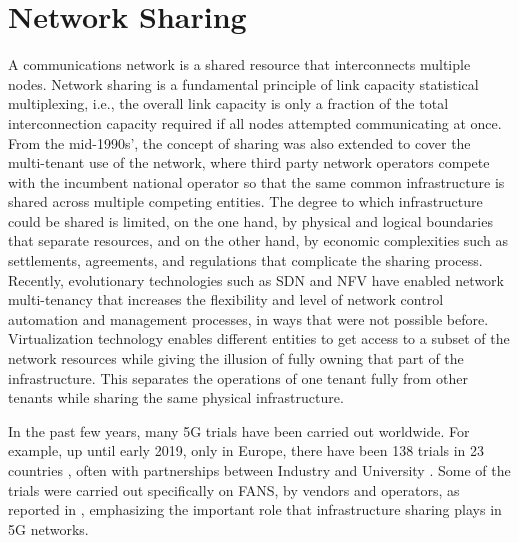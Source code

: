 \section{Network Sharing}
\label{Back:Sec:sharing}

A communications network is a shared resource that interconnects multiple nodes. Network sharing is a fundamental principle of link capacity statistical multiplexing, i.e., the overall link capacity is only a fraction of the total interconnection capacity required if all nodes attempted communicating at once.
From the mid-1990s', the concept of sharing was also extended to cover the multi-tenant use of the network, where third party network operators compete with the incumbent national operator so that the same common infrastructure is shared across multiple competing entities. %
The degree to which infrastructure could be shared is limited, on the one hand, by physical and logical boundaries that separate resources, and on the other hand, by economic complexities such as settlements, agreements, and regulations that complicate the sharing process. Recently, evolutionary technologies such as \ac{SDN} and \ac{NFV} have enabled network multi-tenancy that increases the flexibility and level of network control automation and management processes, in ways that were not possible before.
Virtualization technology enables different entities to get access to a subset of the network resources while giving the illusion of fully owning that part of the infrastructure. This separates the operations of one tenant fully from other tenants while sharing the same physical infrastructure.

In the past few years, many 5G trials have been carried out worldwide. For example, up until early 2019, only in Europe, there have been 138 trials in 23 countries \cite{5G_observatory}, often with partnerships between Industry and University \cite{bristol}. Some of the trials were carried out specifically on \ac{FANS}, by vendors and operators, as reported in \cite{nokia_trial,huawei_trial}, emphasizing the important role that infrastructure sharing plays in \ac{5G} networks.

